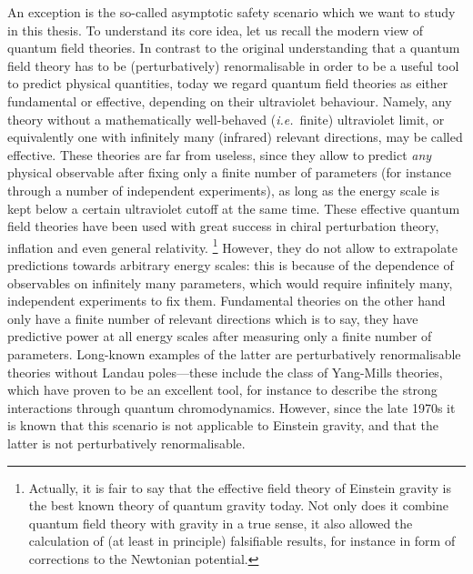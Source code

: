 \documentclass[11pt]{book} %
\newcommand\ie{\textit{i.e.}\ }
\numberwithin{equation}{chapter}
\begin{document}
An exception is the so-called asymptotic safety scenario which we want to study
in this thesis. To understand its core idea, let us recall the modern view of
quantum field theories. In contrast to the original understanding that a quantum
field theory has to be (perturbatively) renormalisable in order to be a useful
tool to predict physical quantities, today we regard quantum field theories
as either fundamental or effective, depending on their ultraviolet behaviour.
Namely, any theory without a mathematically well-behaved (\ie finite) ultraviolet
limit, or equivalently one with infinitely many (infrared) relevant directions,
may be called effective. These theories are far from useless, since they allow
to predict \textit{any} physical observable after fixing
only a finite number of parameters
(for instance through a number of independent experiments),
as long as the energy scale is kept below a certain ultraviolet cutoff at the
same time. These effective quantum field theories have been used with great success
in chiral perturbation theory, inflation and even general relativity.%
\footnote{%
  Actually, it is fair to say that the effective field theory of Einstein gravity
  is the best known theory of quantum gravity today. Not only does it combine
  quantum field theory with gravity in a true sense, it also allowed the calculation
  of (at least in principle) falsifiable results, for instance in form of
  corrections to the Newtonian potential.
}
However, they do not allow to extrapolate predictions towards arbitrary energy scales:
this is because of the dependence of observables on infinitely many parameters, which
would require infinitely many, independent experiments to fix them. Fundamental
theories on the other hand only have a finite number of relevant directions which is
to say, they have predictive power at all energy scales after measuring only a
finite number of parameters. Long-known examples of the latter are perturbatively
renormalisable theories without Landau poles---these include the class of Yang-Mills theories,
which have proven to be an excellent tool,
for instance to describe the strong interactions through quantum chromodynamics.
However, since the late 1970s it is known that this scenario is not applicable to
Einstein gravity, and that the latter is not perturbatively renormalisable.
\end{document}
